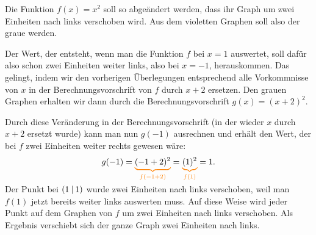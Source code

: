 \documentclass[../../main.tex]{subfiles}
\begin{document}
\begin{example}{}
    Die Funktion $f(x)=x^2$ soll so abgeändert werden, dass ihr Graph um zwei Einheiten nach links verschoben wird. Aus dem violetten Graphen soll also der graue werden.
    \begin{center}
    \end{center}
    Der Wert, der entsteht, wenn man die Funktion $f$ bei $x=1$ auswertet, soll dafür also schon zwei Einheiten weiter links, also bei $x=-1$, herauskommen. Das gelingt, indem wir den vorherigen Überlegungen entsprechend alle Vorkommnisse von $x$ in der Berechnungsvorschrift von $f$ durch $x+2$ ersetzen. Den grauen Graphen erhalten wir dann durch die Berechnungsvorschrift $g(x)=(x+2)^2$. 
    
    Durch diese Veränderung in der Berechnungsvorschrift (in der wieder $x$ durch $x+2$ ersetzt wurde) kann man nun $g(-1)$ ausrechnen und erhält den Wert, der bei $f$ zwei Einheiten weiter rechts gewesen wäre:
    \[g(-1)=\colorbrace{(-1+2)^2}{f(-1+2)}=\colorbrace{(1)^2}{f(1)}=1.\]
    Der Punkt bei $\left(1 \:\middle|\: 1\right)$ wurde zwei Einheiten nach links verschoben, weil man $f(1)$ jetzt bereits weiter links auswerten muss. Auf diese Weise wird jeder Punkt auf dem Graphen von $f$ um zwei Einheiten nach links verschoben. Als Ergebnis verschiebt sich der ganze Graph zwei Einheiten nach links.
\end{example}
\end{document}
